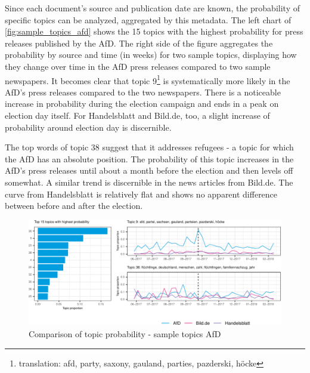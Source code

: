 \documentclass[
  12pt,
]{article}
\begin{document}
Since each document's source and publication date are known, the
probability of specific topics can be analyzed, aggregated by this
metadata. The left chart of \autoref{fig:sample_topics_afd} shows the 15
topics with the highest probability for press releases published by the
AfD. The right side of the figure aggregates the probability by source
and time (in weeks) for two sample topics, displaying how they change
over time in the AfD press releases compared to two sample newspapers.
It becomes clear that topic 9\footnote{translation: afd, party, saxony,
  gauland, parties, pazderski, höcke} is systematically more likely in
the AfD's press releases compared to the two newspapers. There is a
noticeable increase in probability during the election campaign and ends
in a peak on election day itself. For Handelsblatt and Bild.de, too, a
slight increase of probability around election day is discernible.

The top words of topic 38 suggest that it addresses refugees - a topic
for which the AfD has an absolute position. The probability of this
topic increases in the AfD's press releases until about a month before
the election and then levels off somewhat. A similar trend is
discernible in the news articles from Bild.de. The curve from
Handelsblatt is relatively flat and shows no apparent difference between
before and after the election.

\begin{figure}

{\centering \includegraphics[width=1\linewidth]{newspaper_files/figure-latex/Top AfD topics-1} 

}

\caption{Comparison of topic probability - sample topics AfD \label{fig:sample_topics_afd}}\label{fig:Top AfD topics}
\end{figure}
\end{document}
